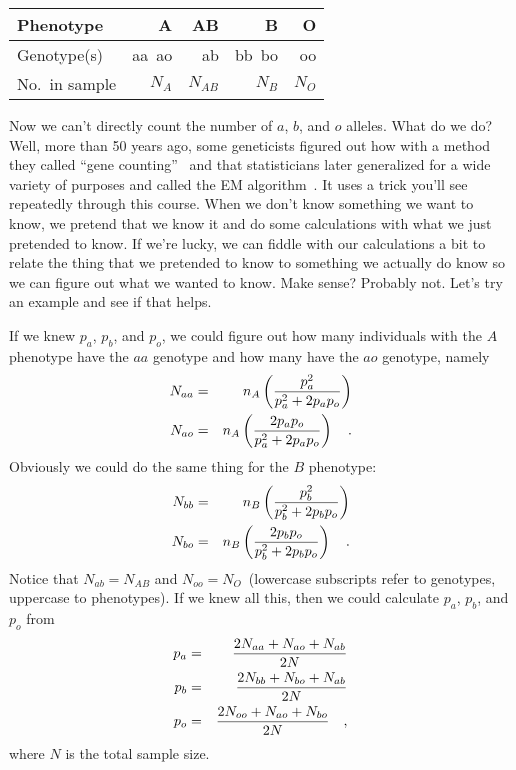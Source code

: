 \begin{center}
\begin{tabular}{l|r|r|r|r}
\hline\hline
Phenotype      & A      & AB       & B       & O  \\
\hline
Genotype(s)    & aa\ ao & ab       & bb\ bo  & oo \\
No.\ in sample & $N_A$  & $N_{AB}$ & $N_{B}$ & $N_O$ \\
\hline
\end{tabular}
\end{center}
Now we can't directly count the number of $a$, $b$, and $o$
alleles. What do we do? Well, more than 50 years ago, some geneticists
figured out how with a method they called ``gene
counting''~\cite{Ceppellini-etal-1955} and that statisticians later
generalized for a wide variety of purposes and called the EM
algorithm~\cite{Dempster-etal-1977}. It uses a trick you'll see
repeatedly through this course. When we don't know something we want
to know, we pretend that we know it and do some calculations with what
we just pretended to know. If we're lucky, we can fiddle with our
calculations a bit to relate the thing that we pretended to know to
something we actually do know so we can figure out what we wanted to
know. Make sense? Probably not. Let's try an example and see if that
helps.

If we knew $p_a$, $p_b$, and $p_o$, we could figure out how many
individuals with the $A$ phenotype have the $aa$ genotype and how many
have the $ao$ genotype, namely
\begin{eqnarray*}
N_{aa} &=& n_A \left({p_a^2 \over p_a^2 + 2p_ap_o}\right) \\
N_{ao} &=& n_A \left({2p_ap_o \over p_a^2 + 2p_ap_o}\right) \quad .
\end{eqnarray*}
Obviously we could do the same thing for the $B$ phenotype:
\begin{eqnarray*}
N_{bb} &=& n_B \left({p_b^2 \over p_b^2 + 2p_bp_o}\right) \\
N_{bo} &=& n_B \left({2p_bp_o \over p_b^2 + 2p_bp_o}\right) \quad .
\end{eqnarray*}
Notice that $N_{ab} = N_{AB}$ and $N_{oo} = N_O$~(lowercase
subscripts refer to genotypes, uppercase to phenotypes). If we knew
all this, then we could calculate $p_a$, $p_b$, and $p_o$ from
\begin{eqnarray*}
p_a &=& {2N_{aa} + N_{ao} + N_{ab} \over 2N} \\
p_b &=& {2N_{bb} + N_{bo} + N_{ab} \over 2N} \\
p_o &=& {2N_{oo} + N_{ao} + N_{bo} \over 2N} \quad ,
\end{eqnarray*}
where $N$ is the total sample size.

